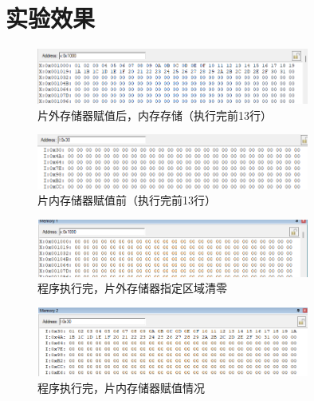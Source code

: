 \documentclass[12pt,hyperref,a4paper,UTF8]{ctexart}
\begin{document}
\section{实验效果}

\begin{figure}[H] %
    \centering
    \includegraphics[width=0.8\textwidth]{figures/201.png} %
    \caption{片外存储器赋值后，内存存储（执行完前13行）} %
    \label{fig:example} %
\end{figure}

\begin{figure}[H] %
    \centering
    \includegraphics[width=0.8\textwidth]{figures/202.png} %
    \caption{片内存储器赋值前（执行完前13行）} %
    \label{fig:example} %
\end{figure}

\begin{figure}[H] %
    \centering
    \includegraphics[width=0.8\textwidth]{figures/203.png} %
    \caption{程序执行完，片外存储器指定区域清零} %
    \label{fig:example} %
\end{figure}

\begin{figure}[H] %
    \centering
    \includegraphics[width=0.8\textwidth]{figures/204.png} %
    \caption{程序执行完，片内存储器赋值情况} %
    \label{fig:example} %
\end{figure}
\end{document}
